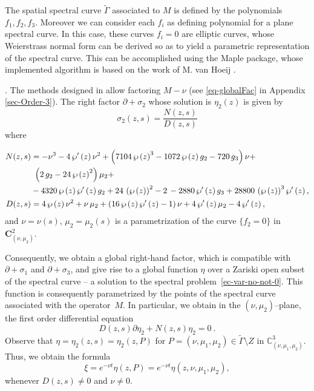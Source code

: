 \documentclass[a4paper,12pt]{article}
\newcommand{\bbC}{\mathbb{C}}
\newcommand{\coC}{\mathbf{C}}
\begin{document}
The spatial spectral curve $\tilde{\Gamma}$ associated to $M$ is defined by the polynomials $f_1 , f_2 , f_3 $. Moreover we can consider each $f_i$ as defining polynomial for a plane spectral curve. In this case, these curves $f_i = 0$ are elliptic curves, whose Weierstrass normal form can be derived so as to yield a parametric representation of the spectral curve. This can be accomplished using the Maple package, whose implemented algorithm is based on the work of M. van Hoeij \cite{van1995algorithm}.




\medskip



.
The methods designed in \cite{RZ2024} allow factoring $M-\nu$ (see \eqref{eq-globalFac} in Appendix \ref{sec-Order-3}). The right factor $\partial+\sigma_2$ whose solution is $\eta_2 (z)$ is given by
\[
\sigma_2 (z,s)={\frac {N(z,s)}{D(z,s)}}
\]
where

    \begin{align*}
     N(z,s)&=-{\nu}^{3}-4\,{\it\wp'} \left( z
 \right) {\nu}^{2}+\left(7104\,  {\it 
\wp} \left( z \right)   ^{3} -1072\,{\it\wp} \left( z \right) { g_2 }-720\,{ g_3 }\right)\nu+  \\
& \ \left(2\,{ g_2 }-24\,  {\it 
\wp} \left( z \right)   ^{2}\right)\mu_{{2}
}+  \\
&-4320\,{\it\wp} \left( z \right) {\it 
\wp'} \left( z \right) { g_2}+24\,
 \left( {\it\wp} \left( z \right) 
 \right) ^{2}-2\,-2880\,{\it \wp'} \left( z \right) { g_3}+
28800\, \left( {\it\wp} \left( z \right) 
 \right) ^{3}{\it\wp'} \left( z
 \right),\\
D(z,s)&=4\,{\it\wp} \left( z \right) {\nu}^{2}+\nu\,\mu_{{2}}+\left(16\,{\it\wp} \left( z \right) {\it\wp'} \left( z \right) -1\right)\nu+4\,{\it\wp'} \left( z \right) \mu_{{2}}-4\,{\it\wp'} \left( z\right) , 
\end{align*}
and $\nu=\nu (s)$, $\mu_2 = \mu_2 (s)$ is a parametrization of the curve $\{f_2 =0 \}$ in $\coC^2_{(\nu , \mu_2 )}$.




Consequently, we  obtain a global right-hand factor, which is compatible with $\partial+\sigma_1 $ and $\partial+\sigma_3$, and give rise to a global function $\eta$ over a Zariski open subset of the spectral curve -- a solution to the spectral problem~\eqref{ec-var-no-not-0}. This function is consequently parametrized by the points of the spectral curve associated with the operator~$M$. In particular,  we obtain in the $(\nu ,\mu_2 )$--plane, the first order differential equation
\[
D(z,s ) \partial \eta_2 + N(z,s) \eta_2 =0 \ .
\]
Observe that $\eta = \eta_2 (z,s ) =\eta_2 (z, P)$ for $P=(\nu , \mu_1 ,\mu_2 )\in\tilde{\Gamma}\setminus Z$ in $\bbC^3_{( \nu ,\mu_1 , \mu_2 )}$. Thus,  we obtain the formula
\[
\xi = e^{-\nu t }\eta (z, P)=e^{-\nu t }\eta (z, \nu ,\mu_1 , \mu_2 ) ,
\]
whenever $D(z,s )\not=0$ and $\nu\not=0$.
\end{document}
